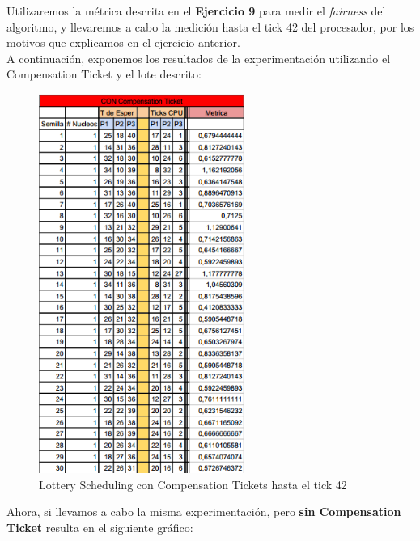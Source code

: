 Utilizaremos la métrica descrita en el \textbf{Ejercicio 9} para medir el \textit{fairness} del algoritmo, y llevaremos a cabo la medición hasta el tick 42 del procesador, por los motivos que explicamos en el ejercicio anterior.\\


A continuación, exponemos los resultados de la experimentación utilizando el Compensation Ticket y el lote descrito:


\begin{figure}[H]
\begin{center}
\includegraphics[width=0.6\textwidth]{img/refotaza1.png}
     \caption{Lottery Scheduling con Compensation Tickets hasta el tick 42}
\end{center}
\end{figure}

Ahora, si llevamos a cabo la misma experimentación, pero \textbf{sin Compensation Ticket} resulta en el siguiente gráfico:

